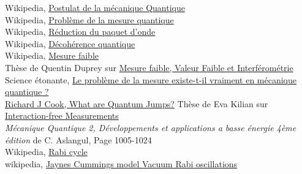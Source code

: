 \documentclass[11pt]{article}
\begin{document}
\newpage

\begin{thebibliography}{MMM99}

 Wikipedia, \href{https://fr.wikipedia.org/wiki/Postulats_de_la_m%C3%A9canique_quantique}{Postulat de la mécanique Quantique}\\

 Wikipedia, \href{https://fr.wikipedia.org/wiki/Probl%C3%A8me_de_la_mesure_quantique}{Problème de la mesure quantique}\\

 Wikipedia, \href{https://fr.wikipedia.org/wiki/R%C3%A9duction_du_paquet_d'onde}{Réduction du paquet d'onde}\\

 Wikipedia, \href{https://fr.wikipedia.org/wiki/D%C3%A9coh%C3%A9rence_quantique}{Décohérence quantique} \\

 Wikipedia, \href{https://fr.wikipedia.org/wiki/Mesure_faible}{Mesure faible}\\

 Thèse de Quentin Duprey sur \href{https://theses.hal.science/tel-02372565}{Mesure faible, Valeur Faible et Interférométrie}\\

 Science étonante, \href{https://scienceetonnante.com/2022/12/08/mesure-quantique-coleman/}{Le problème de la mesure existe-t-il vraiment en mécanique quantique ?}\\

 \href{https://iopscience.iop.org/article/10.1088/0031-8949/1988/T21/009/meta}{Richard J Cook, What are Quantum Jumps?}
 Thèse de Eva Kilian sur \href{https://homepage.univie.ac.at/reinhold.bertlmann/pdfs/dipl_diss/EvaKilian_BA_QuantumZenoEffect_Interaction-freeMeasurements.pdf}{Interaction-free Measurements}\\

 \textit{Mécanique Quantique 2, Développements et applications a basse énergie 4ème édition} de C. Aslangul, Page 1005-1024\\

 Wikipedia, \href{https://en.wikipedia.org/wiki/Rabi_cycle}{Rabi cycle}\\

 wikipedia, \href{https://en.wikipedia.org/wiki/Jaynes%E2%80%93Cummings_model#Vacuum_Rabi_oscillations}{Jaynes Cummings model Vacuum Rabi oscillations}\\


\end{thebibliography}
\end{document}

